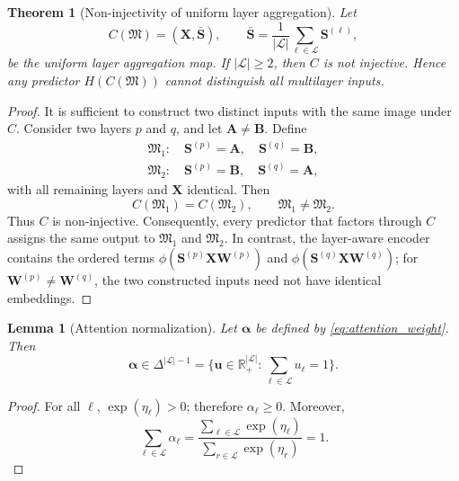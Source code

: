\documentclass[journal]{IEEEtran}
\newtheorem{theorem}{Theorem}
\newtheorem{lemma}{Lemma}
\begin{document}
\begin{theorem}[Non-injectivity of uniform layer aggregation]
Let
\begin{equation}
    C(\mathfrak{M})
    =\left(\mathbf{X},
    \bar{\mathbf{S}}\right),\qquad
    \bar{\mathbf{S}}=\frac{1}{|\mathcal{L}|}
    \sum_{\ell\in\mathcal{L}}\mathbf{S}^{(\ell)},
\end{equation}
be the uniform layer aggregation map. If $|\mathcal{L}|\geq2$, then $C$ is not
injective. Hence any predictor $H(C(\mathfrak{M}))$ cannot distinguish all
multilayer inputs.
\end{theorem}
\begin{proof}
It is sufficient to construct two distinct inputs with the same image under
$C$. Consider two layers $p$ and $q$, and let $\mathbf{A}\neq\mathbf{B}$.
Define
\begin{equation}
\begin{array}{ll}
\mathfrak{M}_1:\quad
\mathbf{S}^{(p)}=\mathbf{A},\quad
\mathbf{S}^{(q)}=\mathbf{B},\\[2mm]
\mathfrak{M}_2:\quad
\mathbf{S}^{(p)}=\mathbf{B},\quad
\mathbf{S}^{(q)}=\mathbf{A},
\end{array}
\end{equation}
with all remaining layers and $\mathbf{X}$ identical. Then
\begin{equation}
    C(\mathfrak{M}_1)
    =C(\mathfrak{M}_2),
    \qquad
    \mathfrak{M}_1\neq\mathfrak{M}_2.
\end{equation}
Thus $C$ is non-injective. Consequently, every predictor
that factors through $C$ assigns the same output to
$\mathfrak{M}_1$ and $\mathfrak{M}_2$. In contrast, the layer-aware encoder
contains the ordered terms
$\phi(\mathbf{S}^{(p)}\mathbf{X}\mathbf{W}^{(p)})$ and
$\phi(\mathbf{S}^{(q)}\mathbf{X}\mathbf{W}^{(q)})$; for
$\mathbf{W}^{(p)}\neq\mathbf{W}^{(q)}$, the two constructed inputs need not
have identical embeddings.
\end{proof}

\begin{lemma}[Attention normalization]
Let $\boldsymbol{\alpha}$ be defined by \eqref{eq:attention_weight}. Then
\begin{equation}
    \boldsymbol{\alpha}\in\Delta^{|\mathcal{L}|-1}
    =\{\mathbf{u}\in\mathbb{R}_{+}^{|\mathcal{L}|}:
    \sum_{\ell\in\mathcal{L}}u_{\ell}=1\}.
\end{equation}
\end{lemma}
\begin{proof}
For all $\ell$, $\exp(\eta_{\ell})>0$; therefore $\alpha_{\ell}\geq0$.
Moreover,
\begin{equation}
    \sum_{\ell\in\mathcal{L}}\alpha_{\ell}
    =
    \frac{\sum_{\ell\in\mathcal{L}}\exp(\eta_{\ell})}
    {\sum_{r\in\mathcal{L}}\exp(\eta_r)}
    =1.
\end{equation}
\end{proof}
\end{document}
